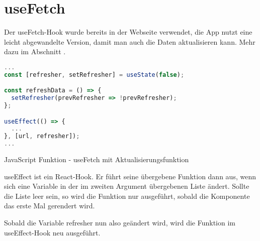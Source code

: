 \section{useFetch}
Der useFetch-Hook wurde bereits in der Webseite verwendet, die App nutzt eine leicht abgewandelte
Version, damit man auch die Daten aktualisieren kann. Mehr dazu im Abschnitt .

\begin{code}[htp]
\begin{lstlisting}[firstnumber=1,language=JavaScript, style=JSX]
...
const [refresher, setRefresher] = useState(false);

const refreshData = () => {
  setRefresher(prevRefresher => !prevRefresher);
};

useEffect(() => {
  ...
}, [url, refresher]);
...
\end{lstlisting}
\caption{JavaScript Funktion - useFetch mit Aktualisierungsfunktion}
\end{code}

useEffect ist ein React-Hook. Er führt seine übergebene Funktion dann aus, wenn sich eine Variable
in der im zweiten Argument übergebenen Liste ändert. Sollte die Liste leer sein, so wird die
Funktion nur ausgeführt, sobald die Komponente das erste Mal gerendert wird.

Sobald die Variable refresher nun also geändert wird, wird die Funktion im useEffect-Hook neu
ausgeführt.